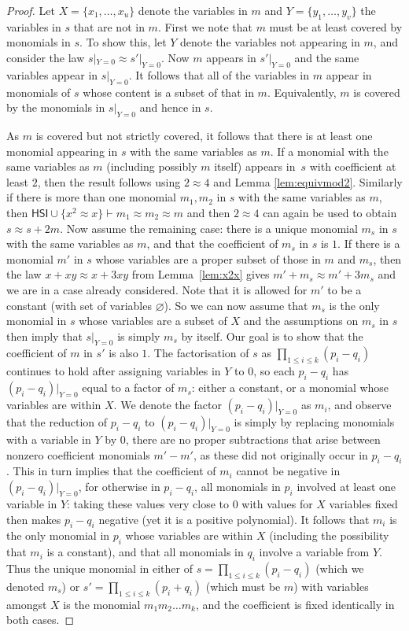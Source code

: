 \documentclass[10pt,a4paper]{amsart}
\newcommand{\HSI}{\textsf{HSI}}
\begin{document}
\begin{proof}
Let $X=\{x_1,\dots,x_u\}$ denote the variables in $m$ and $Y=\{y_1,\dots,y_v\}$ the variables in $s$ that are not in $m$.
First we note that $m$ must be at least covered by monomials in $s$.  
To show this, let $Y$ denote the variables not appearing in $m$, and consider the law $s|_{Y=0}\approx s'|_{Y=0}$.  
Now $m$ appears in $s'|_{Y=0}$ and the same variables appear in  $s|_{Y=0}$. 
It follows that all of the variables in $m$ appear in monomials of $s$ whose content is a subset of that in $m$.
Equivalently, $m$ is covered by the monomials in $s|_{Y=0}$ and hence in $s$.

As $m$ is covered but not strictly covered, it follows that there is at least one monomial appearing in $s$ with the same variables as $m$.  
If a monomial with the same variables as $m$ (including possibly $m$ itself) appears in~$s$ with coefficient at least $2$, then the result follows using $2\approx 4$ and Lemma \ref{lem:equivmod2}.  
Similarly if there is more than one monomial $m_1,m_2$ in $s$ with the same variables as $m$, then $\HSI\cup\{x^2\approx x\}\vdash m_1\approx m_2\approx m$ and then $2\approx 4$ can again be used to obtain $s\approx s+2m$.   
Now assume the remaining case: there is a unique monomial $m_s$ in $s$ with the same variables as $m$, and that the coefficient of $m_s$ in $s$ is $1$.   
If there is a monomial $m'$ in $s$ whose variables are a proper subset of those in $m$ and $m_s$, then the law $x+xy\approx x+3xy$ from Lemma~\ref{lem:x2x} gives $m'+m_s\approx m'+3m_s$ and we are in a case already considered.  Note that it is allowed for $m'$ to be a constant (with set of variables $\varnothing$).  
So we can now assume that $m_s$ is the only monomial in $s$ whose variables are a subset of $X$ and the assumptions on $m_s$ in $s$ then imply that $s|_{Y=0}$ is simply $m_s$ by itself.  Our goal is to show that the coefficient of $m$ in $s'$ is also $1$.    
The factorisation of $s$ as $\prod_{1\leq i\leq k}(p_i-q_i)$ continues to hold after assigning variables in $Y$ to $0$, so each $p_i-q_i$ has $(p_i-q_i)|_{Y=0}$ equal to a factor of $m_s$: either a constant, or a monomial whose variables are within $X$.  
We denote the factor $(p_i-q_i)|_{Y=0}$ as $m_i$, and observe that the reduction of $p_i-q_i$ to $(p_i-q_i)|_{Y=0}$ is simply by replacing monomials with a variable in $Y$ by $0$, there are no proper subtractions that arise between nonzero coefficient monomials $m'-m'$, as these did not originally occur in $p_i-q_i$.
This in turn implies that the coefficient of $m_i$ cannot be negative in $(p_i-q_i)|_{Y=0}$, for otherwise in $p_i-q_i$, all monomials in $p_i$ involved at least one variable in $Y$: taking these values very close to $0$ with values for $X$ variables fixed then makes $p_i-q_i$ negative (yet it is a positive polynomial).
It follows that $m_i$ is the only monomial in $p_i$ whose variables are within $X$ (including the possibility that $m_i$ is a constant), and that all monomials in $q_i$ involve a variable from $Y$. 
Thus the unique monomial in either of $s=\prod_{1\leq i\leq k}(p_i-q_i)$ (which we denoted $m_s$) or $s'=\prod_{1\leq i\leq k}(p_i+q_i)$ (which must be $m$) with variables amongst $X$ is the monomial $m_1m_2\dots m_k$, and the coefficient is fixed identically in both cases.
\end{proof}
\end{document}
